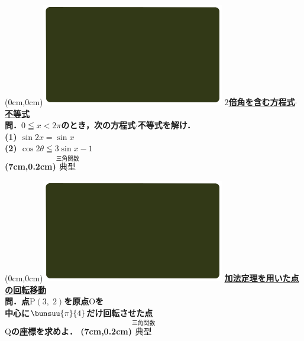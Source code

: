 \documentclass[10pt,
fleqn,
dvipdfmx,
uplatex
]{jsarticle}
\begin{document}
\at(0cm,0cm){\includegraphics[width=8cm,bb=0 0 1920 1080]{./media_local/smart_background/三角関数.jpeg}}
{\color{orange}\bf\boldmath\Large\underline{$2$倍角を含む方程式$\cdot$不等式}}\vspace{0.3zw}\\
\Large 
\bf\boldmath 問．$0\leqq x<2\pi$のとき，次の方程式$\cdot$不等式を解け．\\
(1)  $\sin 2x=\sin x$\\
(2)  $\cos 2\theta \leqq 3\sin x-1$\\

\at(7cm,0.2cm){\small\color{bradorange}$\overset{\text{三角関数}}{\text{典型}}$}


\newpage



\at(0cm,0cm){\includegraphics[width=8cm,bb=0 0 1920 1080]{./media_local/smart_background/三角関数.jpeg}}
{\color{orange}\bf\boldmath\Large\underline{加法定理を用いた点の回転移動}}\vspace{0.3zw}\\
\LARGE 
\bf\boldmath 問．点$\text{P}\left(3,\;2\right)$を原点$\text{O}$を\vspace{0.5zw}\\中心に$\bunsuu{\pi }{4}$だけ回転させた点\vspace{0.2zw}\\$\text{Q}$の座標を求めよ．
\at(7cm,0.2cm){\small\color{bradorange}$\overset{\text{三角関数}}{\text{典型}}$}


\newpage
\end{document}
